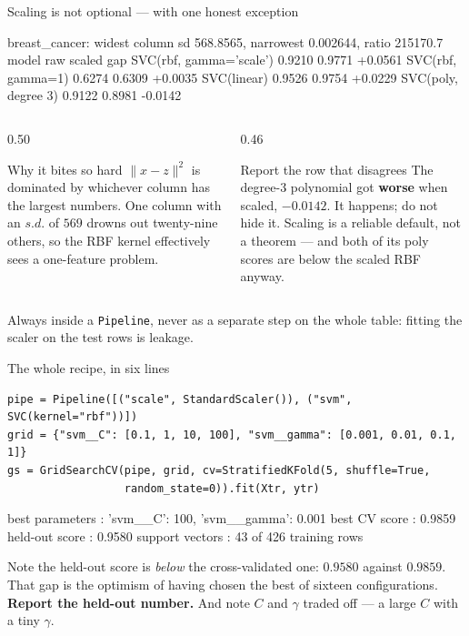 \documentclass[aspectratio=169]{beamer}
\begin{document}
\begin{frame}[fragile,shrink=6]{Scaling is not optional --- with one honest exception}
\begin{outblk}
breast_cancer: widest column sd 568.8565, narrowest 0.002644, ratio 215170.7
model                           raw   scaled      gap
SVC(rbf, gamma='scale')      0.9210   0.9771  +0.0561
SVC(rbf, gamma=1)            0.6274   0.6309  +0.0035
SVC(linear)                  0.9526   0.9754  +0.0229
SVC(poly, degree 3)          0.9122   0.8981  -0.0142
\end{outblk}
  \begin{columns}[T]
    \begin{column}{0.50\textwidth}
      \begin{block}{Why it bites so hard}
        $\|x - z\|^2$ is dominated by whichever column has the largest
        numbers. One column with an $s.d.$ of $569$ drowns out
        twenty-nine others, so the RBF kernel effectively sees a
        one-feature problem.
      \end{block}
    \end{column}
    \begin{column}{0.46\textwidth}
      \begin{alertblock}{Report the row that disagrees}
        The degree-3 polynomial got \textbf{worse} when scaled,
        $-0.0142$. It happens; do not hide it. Scaling is a reliable default,
        not a theorem --- and both of its poly scores are below the scaled
        RBF anyway.
      \end{alertblock}
    \end{column}
  \end{columns}
  \begin{center}\small
    Always inside a \texttt{Pipeline}, never as a separate step on the whole
    table: fitting the scaler on the test rows is leakage.
  \end{center}
\end{frame}

\begin{frame}[fragile,shrink=5]{The whole recipe, in six lines}
\begin{lstlisting}
pipe = Pipeline([("scale", StandardScaler()), ("svm", SVC(kernel="rbf"))])
grid = {"svm__C": [0.1, 1, 10, 100], "svm__gamma": [0.001, 0.01, 0.1, 1]}
gs = GridSearchCV(pipe, grid, cv=StratifiedKFold(5, shuffle=True,
                  random_state=0)).fit(Xtr, ytr)
\end{lstlisting}
\begin{outblk}
best parameters : {'svm__C': 100, 'svm__gamma': 0.001}
best CV score   : 0.9859
held-out score  : 0.9580
support vectors : 43 of 426 training rows
\end{outblk}
  \begin{center}\small
    Note the held-out score is \emph{below} the cross-validated one:
    $0.9580$ against $0.9859$. That gap is the optimism of having chosen
    the best of sixteen configurations. \textbf{Report the held-out number.}
    And note $C$ and $\gamma$ traded off --- a large $C$ with a tiny
    $\gamma$.
  \end{center}
\end{frame}
\end{document}

